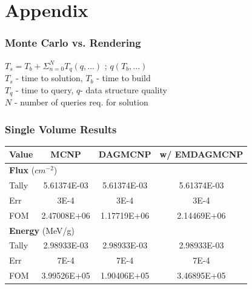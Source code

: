 \documentclass[12pt]{beamer}
\begin{document}
\begin{frame}
  
  \footnotesize{}
\end{frame}

\section{Appendix}

\begin{frame}
\frametitle{Monte Carlo vs. Rendering}
\begin{center}
$T_s = T_b + \Sigma_{n=0}^{N} T_q(q,...)$ ; $q(T_b,...)$\\
\vfill
\small{
$T_s$ - time to solution, $T_b$ - time to build \\
  $T_q$ - time to query, $q$- data structure quality\\
$N$ - number of queries req. for solution}
\end{center}

\end{frame}
\begin{frame}
\frametitle{Single Volume Results}

\begin{table}[h]

  \begin{center}

    \begin{tabular}{lccc}
     \toprule
      Value & MCNP & DAGMCNP & w/ EMDAGMCNP \\
     \toprule
     \multicolumn{4}{l}{\textbf{Flux} ($cm^{-2}$)} \\
     \hline
     Tally & 5.61374E-03 & 5.61374E-03 & 5.61374E-03 \\
     Err & 3E-4 & 3E-4 & 3E-4  \\
     FOM & 2.47008E+06 & 1.17719E+06 & 2.14469E+06 \\
     \hline
     \multicolumn{4}{l}{\textbf{Energy} (MeV/g)} \\
     \hline
     Tally & 2.98933E-03 & 2.98933E-03 & 2.98933E-03 \\
     Err & 7E-4 & 7E-4 & 7E-4 \\
     FOM & 3.99526E+05 & 1.90406E+05 & 3.46895E+05 \\
     \bottomrule
     
    \end{tabular}


  \end{center}
\vspace{-0.4cm}
\end{table}

\end{frame}
\end{document}
